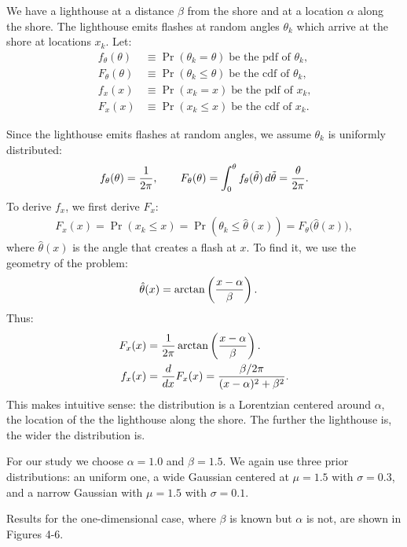 \documentclass{article}
\theoremstyle{definition}
\renewcommand{\dd}[2]{\ensuremath\frac{d#1}{d#2}}
\renewcommand{\sp}[1]{\;\;\;\text{ #1 }\;\;\;}
\begin{document}
We have a lighthouse at a distance $\beta$ from the shore and
at a location $\alpha$ along the shore. The lighthouse emits
flashes at random angles $\theta_k$ which arrive at the shore
at locations $x_k$.
Let:
\begin{align*}
f_\theta(\theta) &\equiv \Pr(\theta_k = \theta) \;\text{be the
pdf of $\theta_k$,} \\
F_\theta(\theta) &\equiv \Pr(\theta_k \le \theta) \;\text{be the
cdf of $\theta_k$,} \\
f_x(x) &\equiv \Pr(x_k = x) \;\text{be the
pdf of $x_k$,} \\
F_x(x) &\equiv \Pr(x_k \le x) \;\text{be the
cdf of $x_k$.}
\end{align*}

Since the lighthouse emits flashes at random angles, we assume
$\theta_k$ is uniformly distributed:
\begin{align*}
f_\theta(\theta) = {1 \over 2\pi},
\sp{}
F_\theta(\theta) = \int_0^\theta f_\theta(\tilde\theta) \, d\tilde\theta
= {\theta \over 2\pi}.
\end{align*}
To derive $f_x$, we first derive $F_x$:
\begin{align*}
F_x(x) = \Pr(x_k \le x) = \Pr(\theta_k \le \hat\theta(x)) =
F_\theta\Big(\hat\theta(x)\Big),
\end{align*}
where $\hat\theta(x)$ is the angle that creates a flash at $x$. To find it,
we use the geometry of the problem:
\begin{align*}
\hat\theta(x) &= \arctan\left(x - \alpha \over \beta\right).
\end{align*}
Thus:
\begin{align*}
F_x(x) &= {1 \over 2\pi} \arctan\left(x - \alpha \over \beta\right).
\\
f_x(x) &= \dd{}{x} F_x(x) = {\beta / 2\pi \over (x - \alpha)^2 + \beta^2}.
\end{align*}
This makes intuitive sense: the distribution is a Lorentzian centered
around $\alpha$, the location of the the lighthouse along the shore. The
further the lighthouse is, the wider the distribution is.

For our study we choose $\alpha = 1.0$ and $\beta = 1.5$.
We again use three prior distributions: an uniform one, a wide Gaussian
centered at $\mu = 1.5$ with $\sigma = 0.3$, and a narrow Gaussian with
$\mu = 1.5$ with $\sigma = 0.1$.

Results for the one-dimensional case, where $\beta$ is known but $\alpha$
is not, are shown in Figures 4-6.
\end{document}
